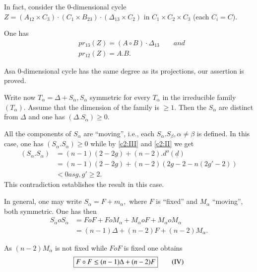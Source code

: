 In fact, consider the $0$-dimensional cycle $ Z = (A_{12}\times
C_3)\cdot(C_1 \times B_{23})\cdot(\Delta_{13} \times C_2)$ in $C_1
\times C_2 \times C_3$ (each $C_i = C $). 

One has 
\begin{align*}
  & pr_{13} (Z) = (A \circ B)\cdot \Delta _{13} \qquad and\\
  & pr_{12} (Z) = A.B.
\end{align*}

As\pageoriginale a $0$-dimensional cycle has the same degree as its projections, our
assertion is proved. 

Write now $ T_\alpha = \Delta + S_\alpha , S_\alpha $ symmetric for
every $ T_\alpha $ in the irreducible family $ (T_\alpha)$. Assume
that the dimension of the family is $\geq 1$. Then the $ S_\alpha $
are distinct from $\Delta$ and one has $(\Delta. S_\alpha)\geq 0$. 

\setcounter{case}{0}
\begin{case}\label{chap2:sec3:case1}%
  All the components of $S_\alpha $ are ``moving'', i.e., each $ S_\alpha
  .S_\beta , \alpha \neq \beta $ is defined.  In this case, one has $
  (S_\alpha.S_\alpha) \ge 0 $ while by \eqref{c2:III} and \eqref{c2:II} we get  
  \begin{align*}
    (S_\alpha.S_\alpha) &= (n-1)(2-2g)+(n-2).d^o (\underline{d})\\
    &= (n-1)(2-2g)+(n-2)(2g-2-n(2g'-2))\\
    & < 0 as g,g'\ge 2.  
  \end{align*} 
  This contradiction establishes the result in this case. 
\end{case}

\begin{case}\label{chap2:sec3:case2}%
  In general, one may write $ S_\alpha = F + m_\alpha, $ where $F$ is
  ``fixed'' and $ M_\alpha $ ``moving'', both symmetric. One has then 
  \begin{align*}
    S_{\alpha } o S_{\alpha } &=F o F + F o  M_{\alpha } + M_{\alpha }
    o F + M_{\alpha } o M_{\alpha }\\ 
    &=(n-1) \Delta + (n-2)F +(n-2)M_{\alpha }.
  \end{align*}
\end{case}

As $(n-2)M_{\alpha }$ is not fixed while $F o F$ is fixed one obtains 
\begin{equation*}
  \fbox{$F \circ F \le (n-1) \Delta + (n-2)F$} \tag{IV}\label{c2:IV}
\end{equation*}

